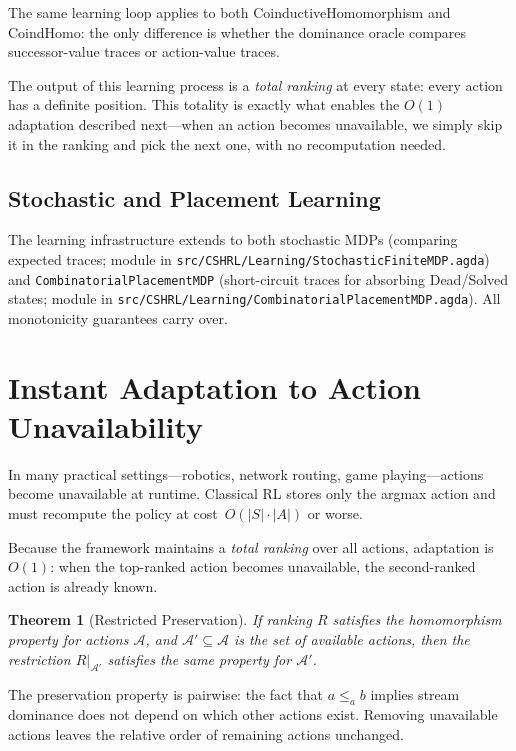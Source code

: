 \documentclass[9pt,a4paper]{article}
\newcommand{\fpath}[1]{\nolinkurl{#1}}
\theoremstyle{plain}
\newtheorem{theorem}{Theorem}
\theoremstyle{definition}
\theoremstyle{remark}
\begin{document}
\noindent The same learning loop applies to both CoinductiveHomomorphism and CoindHomo: the only difference is whether the dominance oracle compares successor-value traces or action-value traces.

The output of this learning process is a \emph{total ranking} at every state: every action has a definite position.  This totality is exactly what enables the $O(1)$ adaptation described next---when an action becomes unavailable, we simply skip it in the ranking and pick the next one, with no recomputation needed.

\subsection{Stochastic and Placement Learning}

The learning infrastructure extends to both stochastic MDPs (comparing expected traces; module in \fpath{src/CSHRL/Learning/StochasticFiniteMDP.agda}) and \texttt{CombinatorialPlacementMDP} (short-circuit traces for absorbing Dead/Solved states; module in \fpath{src/CSHRL/Learning/CombinatorialPlacementMDP.agda}).  All monotonicity guarantees carry over.

\section{Instant Adaptation to Action Unavailability}\label{sec:adaptation}

In many practical settings---robotics, network routing, game playing---actions become unavailable at runtime.  Classical RL stores only the argmax action and must recompute the policy at cost~$O(|S| \cdot |A|)$ or worse.

Because the framework maintains a \emph{total ranking} over all actions, adaptation is $O(1)$: when the top-ranked action becomes unavailable, the second-ranked action is already known.

\begin{theorem}[Restricted Preservation]
If ranking $R$ satisfies the homomorphism property for actions $\mathcal{A}$, and $\mathcal{A}' \subseteq \mathcal{A}$ is the set of available actions, then the restriction $R|_{\mathcal{A}'}$ satisfies the same property for $\mathcal{A}'$.
\end{theorem}

\noindent The preservation property is pairwise: the fact that $a \le_a b$ implies stream dominance does not depend on which other actions exist.  Removing unavailable actions leaves the relative order of remaining actions unchanged.
\end{document}
